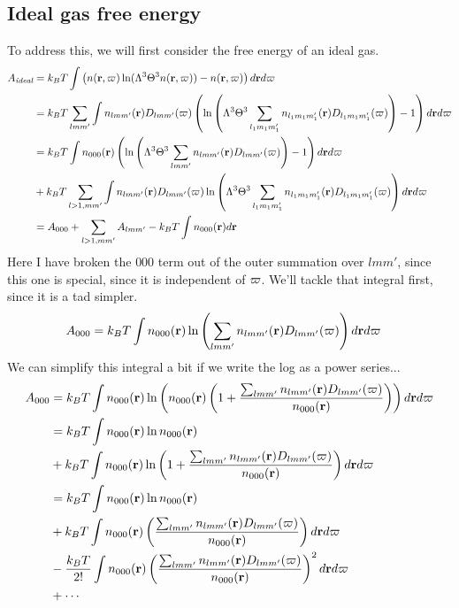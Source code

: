 \documentclass[letterpaper,twocolumn,amsmath,amssymb,pre]{revtex4-1}
\begin{document}
\subsection{Ideal gas free energy}
To address this, we will
first consider the free energy of an ideal gas.
\begin{align}
  A_{\textit{ideal}} &=
  k_BT \int
  \left(n(\mathbf{r},\mathbf{\varpi})\ln(\Lambda^3\Theta^3 n(\mathbf{r},\mathbf{\varpi})) - n(\mathbf{r},\mathbf{\varpi})
  \right) d\mathbf{r} d\mathbf{\varpi}
  \\
  &=
  k_BT \sum_{lmm'} \int
  n_{lmm'}(\mathbf{r})D_{lmm'}(\mathbf{\varpi})\left(
  \ln\left(\Lambda^3\Theta^3 \sum_{l_1m_1m'_1} n_{l_1m_1m'_1}(\mathbf{r})D_{l_1m_1m'_1}(\mathbf{\varpi})\right) - 1
  \right) d\mathbf{r} d\mathbf{\varpi}
  \\
  &=
  k_BT \int n_{000}(\mathbf{r})
  \left(\ln\left(\Lambda^3\Theta^3 \sum_{lmm'} n_{lmm'}(\mathbf{r})D_{lmm'}(\mathbf{\varpi})\right) - 1
  \right) d\mathbf{r} d\mathbf{\varpi}
  \\&+
  k_BT \sum_{l>1,mm'} \int
  n_{lmm'}(\mathbf{r})D_{lmm'}(\mathbf{\varpi})
  \ln\left(\Lambda^3\Theta^3 \sum_{l_1m_1m'_1} n_{l_1m_1m'_1}(\mathbf{r})D_{l_1m_1m'_1}(\mathbf{\varpi})\right)
  d\mathbf{r} d\mathbf{\varpi}
  \\
  &= A_{000} + \sum_{l>1,mm'} A_{lmm'} - k_BT\int n_{000}(\mathbf{r})d\mathbf{r}
\end{align}
Here I have broken the $000$ term out of the outer summation over
$lmm'$, since this one is special, since it is independent of $\mathbf{\varpi}$.
We'll tackle that integral first, since it is a tad simpler.
\begin{align}
  A_{000} &= k_BT\int
  n_{000}(\mathbf{r})\ln\left(
  \sum_{lmm'} n_{lmm'}(\mathbf{r})D_{lmm'}(\mathbf{\varpi})
  \right)
  d\mathbf{r} d\mathbf{\varpi}
\end{align}
We can simplify this integral a bit if we write the log as a power
series...
\begin{align}
  A_{000}
  &= k_BT\int
  n_{000}(\mathbf{r})\ln\left(
  n_{000}(\mathbf{r})\left(1 + \frac{\sum_{lmm'} n_{lmm'}(\mathbf{r})D_{lmm'}(\mathbf{\varpi})}{n_{000}(\mathbf{r})}\right)
  \right)
  d\mathbf{r} d\mathbf{\varpi}
  \\
  &= k_BT\int
  n_{000}(\mathbf{r})\ln n_{000}(\mathbf{r})
  \\&+k_BT\int
  n_{000}(\mathbf{r})\ln\left(1 + \frac{\sum_{lmm'} n_{lmm'}(\mathbf{r})D_{lmm'}(\mathbf{\varpi})}{n_{000}(\mathbf{r})}\right)
  d\mathbf{r} d\mathbf{\varpi}
  \\
  &= k_BT\int
  n_{000}(\mathbf{r})\ln n_{000}(\mathbf{r})
  \\&+k_BT\int
  n_{000}(\mathbf{r})\left(\frac{\sum_{lmm'} n_{lmm'}(\mathbf{r})D_{lmm'}(\mathbf{\varpi})}{n_{000}(\mathbf{r})}\right)
  d\mathbf{r} d\mathbf{\varpi}
  \\&-\frac{k_BT}{2!}\int
  n_{000}(\mathbf{r})\left(\frac{\sum_{lmm'} n_{lmm'}(\mathbf{r})D_{lmm'}(\mathbf{\varpi})}{n_{000}(\mathbf{r})}\right)^2
  d\mathbf{r} d\mathbf{\varpi}
  \\&+\cdots
\end{align}
\end{document}
